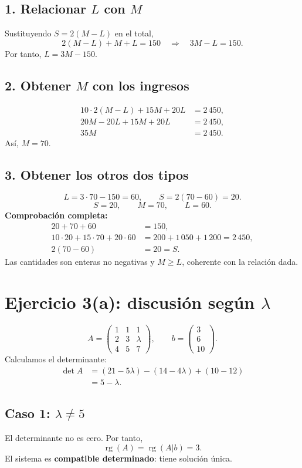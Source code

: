\documentclass[11pt]{article}
\begin{document}
\subsection*{1. Relacionar $L$ con $M$}
Sustituyendo $S=2(M-L)$ en el total,
\[2(M-L)+M+L=150\quad\Longrightarrow\quad3M-L=150.\]
Por tanto, $L=3M-150$.
\subsection*{2. Obtener $M$ con los ingresos}
\begin{align*}
10\cdot2(M-L)+15M+20L&=2\,450,\\20M-20L+15M+20L&=2\,450,\\35M&=2\,450.
\end{align*}
Así, $M=70$.
\subsection*{3. Obtener los otros dos tipos}
\[L=3\cdot70-150=60,\qquad S=2(70-60)=20.\]
\[\boxed{S=20,\qquad M=70,\qquad L=60}.\]
\textbf{Comprobación completa:}
\begin{align*}
20+70+60&=150,\\10\cdot20+15\cdot70+20\cdot60&=200+1\,050+1\,200=2\,450,\\2(70-60)&=20=S.
\end{align*}
Las cantidades son enteras no negativas y $M\geq L$, coherente con la relación dada.
\clearpage
\section*{Ejercicio 3(a): discusión según $\lambda$}
\[
A=\begin{pmatrix}1&1&1\\2&3&\lambda\\4&5&7\end{pmatrix},\qquad
b=\begin{pmatrix}3\\6\\10\end{pmatrix}.
\]
Calculamos el determinante:
\begin{align*}
\det A&=(21-5\lambda)-(14-4\lambda)+(10-12)\\
&=5-\lambda.
\end{align*}
\subsection*{Caso 1: $\lambda\neq5$}
El determinante no es cero. Por tanto,
\[\operatorname{rg}(A)=\operatorname{rg}(A|b)=3.\]
El sistema es \textbf{compatible determinado}: tiene solución única.
\end{document}
